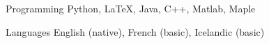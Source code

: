 


\begin{cvskills}

  \cvskill
    {Programming} %
    {Python, LaTeX, Java, C++, Matlab, Maple} %

  \cvskill
    {Languages} %
    {English (native), French (basic), Icelandic (basic)} %

\end{cvskills}
